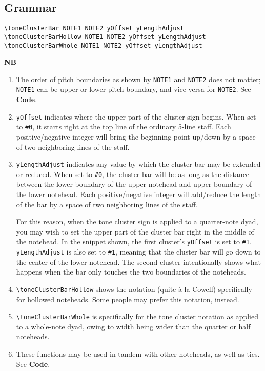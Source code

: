 \documentclass[11pt, oneside]{book}   	%
\begin{document}
\subsection{Grammar}
\begin{verbatim}
\toneClusterBar NOTE1 NOTE2 yOffset yLengthAdjust
\toneClusterBarHollow NOTE1 NOTE2 yOffset yLengthAdjust
\toneClusterBarWhole NOTE1 NOTE2 yOffset yLengthAdjust
\end{verbatim}
\textbf{NB} \begin{enumerate}
\item The order of pitch boundaries as shown by \verb|NOTE1| and \verb|NOTE2| does not matter; \verb|NOTE1| can be upper or lower pitch boundary, and vice versa for \verb|NOTE2|. See \textbf{Code}. 
\item \verb|yOffset| indicates where the upper part of the cluster sign begins. When set to \verb|#0|, it starts right at the top line of the ordinary 5-line staff. Each positive/negative integer will bring the beginning point up/down by a space of two neighboring lines of the staff.
\item \verb|yLengthAdjust| indicates any value by which the cluster bar may be extended or reduced. When set to \verb|#0|, the cluster bar will be as long as the distance between the lower boundary of the upper notehead and upper boundary of the lower notehead. Each positive/negative integer will add/reduce the length of the bar by a space of two neighboring lines of the staff.

For this reason, when the tone cluster sign is applied to a quarter-note dyad, you may wish to set the upper part of the cluster bar right in the middle of the notehead. In the snippet shown, the first cluster's \verb|yOffset| is set to \verb|#1|.  \verb|yLengthAdjust| is also set to \verb|#1|, meaning that the cluster bar will go down to the center of the lower notehead. The second cluster intentionally shows what happens when the bar only touches the two boundaries of the noteheads.

\item \verb|\toneClusterBarHollow| shows the notation (quite à la Cowell) specifically for hollowed noteheads. Some people may prefer this notation, instead.
\item \verb|\toneClusterBarWhole| is specifically for the tone cluster notation as applied to a whole-note dyad, owing to width being wider than the quarter or half noteheads. 

\item These functions may be used in tandem with other noteheads, as well as ties. See \textbf{Code}. 

\end{enumerate}
\end{document}

